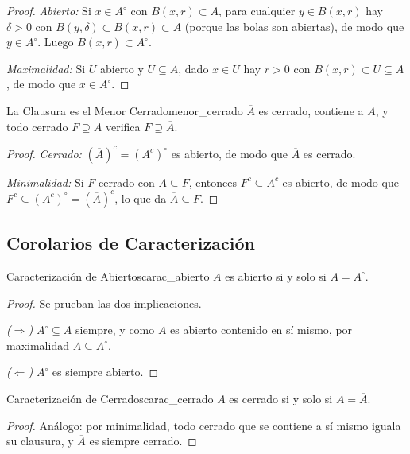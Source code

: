 \documentclass[11pt, a4paper]{article}
\begin{document}
\begin{proof}
\textit{Abierto:} Si $x \in A^\circ$ con $B(x, r) \subset A$, para cualquier $y \in B(x, r)$ hay
$\delta > 0$ con $B(y, \delta) \subset B(x, r) \subset A$ (porque las bolas son abiertas), de modo que
$y \in A^\circ$. Luego $B(x, r) \subset A^\circ$.

\textit{Maximalidad:} Si $U$ abierto y $U \subseteq A$, dado $x \in U$ hay $r > 0$ con
$B(x, r) \subset U \subseteq A$, de modo que $x \in A^\circ$.
\end{proof}

\begin{proposicion}{La Clausura es el Menor Cerrado}{menor_cerrado}
$\overline{A}$ es cerrado, contiene a $A$, y todo cerrado $F \supseteq A$ verifica
$F \supseteq \overline{A}$.
\end{proposicion}

\begin{proof}
\textit{Cerrado:} $(\overline{A})^c = (A^c)^\circ$ es abierto, de modo que $\overline{A}$ es cerrado.

\textit{Minimalidad:} Si $F$ cerrado con $A \subseteq F$, entonces $F^c \subseteq A^c$ es abierto,
de modo que $F^c \subseteq (A^c)^\circ = (\overline{A})^c$, lo que da $\overline{A} \subseteq F$.
\end{proof}

\subsection{Corolarios de Caracterización}

\begin{corolario}{Caracterización de Abiertos}{carac_abierto}
$A$ es abierto si y solo si $A = A^\circ$.

\begin{proof}
Se prueban las dos implicaciones.

\textit{($\Rightarrow$)} $A^\circ \subseteq A$ siempre, y como $A$ es abierto contenido en sí mismo, por
maximalidad $A \subseteq A^\circ$.

\textit{($\Leftarrow$)} $A^\circ$ es siempre abierto.
\end{proof}
\end{corolario}

\begin{corolario}{Caracterización de Cerrados}{carac_cerrado}
$A$ es cerrado si y solo si $A = \overline{A}$.

\begin{proof}
Análogo: por minimalidad, todo cerrado que se contiene a sí mismo iguala su clausura, y
$\overline{A}$ es siempre cerrado.
\end{proof}
\end{corolario}
\end{document}
